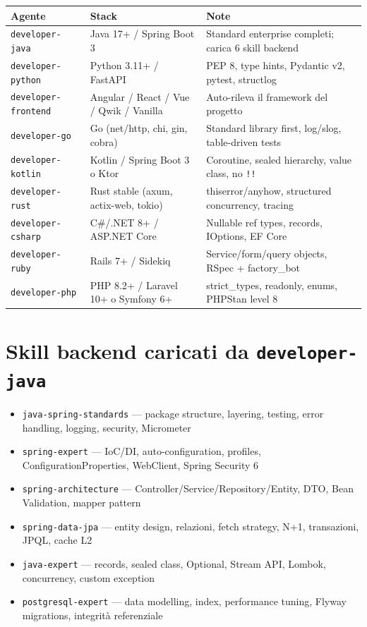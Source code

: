 \documentclass[12pt,a4paper,twoside]{book}
\begin{document}
\begin{center}
\begin{longtable}{lll}
\toprule
\textbf{Agente} & \textbf{Stack} & \textbf{Note} \\
\midrule
\endhead
\texttt{developer-java} & Java 17+ / Spring Boot 3 & Standard enterprise completi; carica 6 skill backend \\
\texttt{developer-python} & Python 3.11+ / FastAPI & PEP 8, type hints, Pydantic v2, pytest, structlog \\
\texttt{developer-frontend} & Angular / React / Vue / Qwik / Vanilla & Auto-rileva il framework del progetto \\
\texttt{developer-go} & Go (net/http, chi, gin, cobra) & Standard library first, log/slog, table-driven tests \\
\texttt{developer-kotlin} & Kotlin / Spring Boot 3 o Ktor & Coroutine, sealed hierarchy, value class, no \texttt{!!} \\
\texttt{developer-rust} & Rust stable (axum, actix-web, tokio) & thiserror/anyhow, structured concurrency, tracing \\
\texttt{developer-csharp} & C\#/.NET 8+ / ASP.NET Core & Nullable ref types, records, IOptions, EF Core \\
\texttt{developer-ruby} & Rails 7+ / Sidekiq & Service/form/query objects, RSpec + factory\_bot \\
\texttt{developer-php} & PHP 8.2+ / Laravel 10+ o Symfony 6+ & strict\_types, readonly, enums, PHPStan level 8 \\
\bottomrule
\end{longtable}
\end{center}

\section{Skill backend caricati da \texttt{developer-java}}

\begin{itemize}
  \item \texttt{java-spring-standards} — package structure, layering, testing, error handling, logging, security, Micrometer
  \item \texttt{spring-expert} — IoC/DI, auto-configuration, profiles, ConfigurationProperties, WebClient, Spring Security 6
  \item \texttt{spring-architecture} — Controller/Service/Repository/Entity, DTO, Bean Validation, mapper pattern
  \item \texttt{spring-data-jpa} — entity design, relazioni, fetch strategy, N+1, transazioni, JPQL, cache L2
  \item \texttt{java-expert} — records, sealed class, Optional, Stream API, Lombok, concurrency, custom exception
  \item \texttt{postgresql-expert} — data modelling, index, performance tuning, Flyway migrations, integrità referenziale
\end{itemize}
\end{document}

